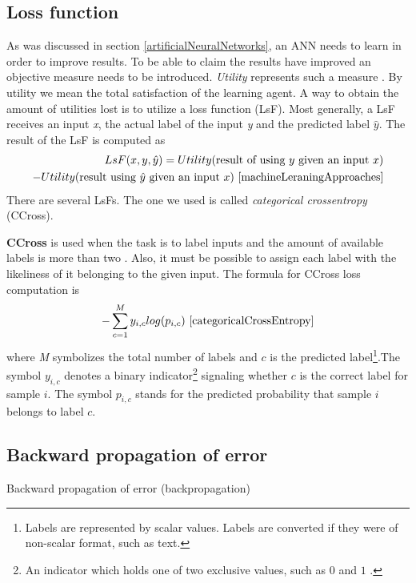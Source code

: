 \subsection{Loss function}\label{lossFunction}
As was discussed in section \ref{artificialNeuralNetworks}, an ANN needs to learn in order to improve results. To be able to claim the results have improved an objective measure needs to be introduced. \textit{Utility} represents such a measure \cite{machineLeraningApproaches}. By utility we mean the total satisfaction of the learning agent. A way to obtain the amount of utilities lost is to utilize a loss function (LsF). Most generally, a LsF receives an input \textit{x}, the actual label of the input \textit{y} and the predicted label $\hat{y}$. The result of the LsF is computed as
\[
\begin{aligned}
LsF(x, y, \hat{y}) = Utility(\text{result of using }y \text{ given an input }x) \\
- Utility(\text{result using }\hat{y} \text{ given an input }x)~\cite{machineLeraningApproaches}
\end{aligned}
\]
There are several LsFs. The one we used is called \textit{categorical crossentropy} (CCross). 

\textbf{CCross} is used when the task is to label inputs and the amount of available labels is more than two \cite{categoricalCrossEntropy}. Also, it must be possible to assign each label with the likeliness of it belonging to the given input. The formula for CCross loss computation is
\[
-\sum\limits_{c=1}^M y_{i,c} log(p_{i, c})~\cite{categoricalCrossEntropy}
\]
where \textit{M} symbolizes the total number of labels and $c$ is the predicted label\footnote{Labels are represented by scalar values. Labels are converted if they were of non-scalar format, such as text.}.The symbol $y_{i, c}$ denotes a binary indicator\footnote{An indicator which holds one of two exclusive values, such as $0$ and $1$ .} signaling whether $c$ is the correct label for sample $i$. The symbol $p_{i, c}$ stands for the predicted probability that sample $i$ belongs to label $c$.

\subsection{Backward propagation of error}\label{backpropagation}
Backward propagation of error (backpropagation)
